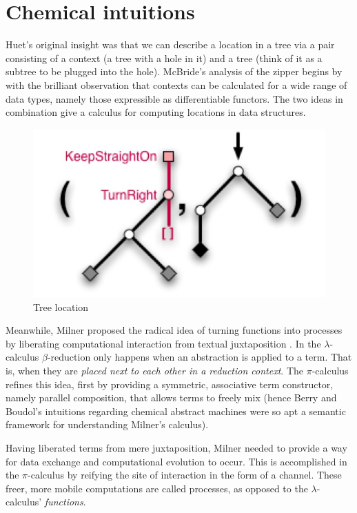 \section{Chemical intuitions}\label{sec:chemical-intuitions} %
Huet's original insight was that we can describe a location in a tree
via a pair consisting of a context (a tree with a hole in it) and a
tree (think of it as a subtree to be plugged into the hole).
McBride's analysis of the zipper begins by with the brilliant
observation that contexts can be calculated for a wide range of data
types, namely those expressible as differentiable functors. The two
ideas in combination give a calculus for computing locations in data
structures.

\begin{figure}
  \includegraphics[width=\linewidth]{ZipperFigure1.jpg}
  \caption{Tree location}
  \label{fig:tree-location}
\end{figure}

Meanwhile, Milner proposed the radical idea of turning functions into
processes by liberating computational interaction from textual
juxtaposition \cite{DBLP:journals/mscs/Milner92}. In the
$\lambda$-calculus $\beta$-reduction only happens when an abstraction
is applied to a term. That is, when they are \emph{placed next to each
  other in a reduction context}. The $\pi$-calculus refines this idea,
first by providing a symmetric, associative term constructor, namely
parallel composition, that allows terms to freely mix (hence Berry and
Boudol's intuitions regarding chemical abstract machines
\cite{DBLP:journals/tcs/BerryB92} were so apt a semantic framework for
understanding Milner's calculus).

Having liberated terms from mere juxtaposition, Milner needed to
provide a way for data exchange and computational evolution to
occur. This is accomplished in the $\pi$-calculus by reifying the site
of interaction in the form of a channel. These freer, more mobile
computations are called processes, as opposed to the
$\lambda$-calculus' \emph{functions}.

